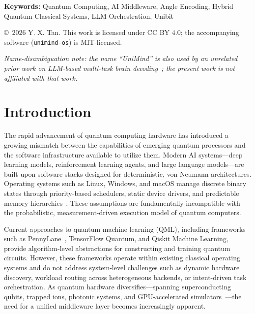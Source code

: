﻿\documentclass[12pt,a4paper]{article}
\begin{document}
\begin{titlepage}
\vspace{0.8cm}

\noindent\textbf{Keywords:} Quantum Computing, AI Middleware, Angle Encoding, Hybrid Quantum-Classical Systems, LLM Orchestration, Unibit

\vfill

{\small\copyright\ 2026 Y. X. Tan. This work is licensed under CC BY 4.0; the accompanying software (\texttt{unimind-os}) is MIT-licensed.}

\vspace{0.4cm}

{\small\itshape Name-disambiguation note: the name ``UniMind'' is also used by an unrelated prior work on LLM-based multi-task brain decoding~\cite{lu2025unimind}; the present work is not affiliated with that work.\par}

\end{titlepage}

\tableofcontents
\newpage

\section{Introduction}

The rapid advancement of quantum computing hardware has introduced a growing mismatch between the capabilities of emerging quantum processors and the software infrastructure available to utilize them. Modern AI systems---deep learning models, reinforcement learning agents, and large language models---are built upon software stacks designed for deterministic, von Neumann architectures. Operating systems such as Linux, Windows, and macOS manage discrete binary states through priority-based schedulers, static device drivers, and predictable memory hierarchies~\cite{tanenbaum2023}. These assumptions are fundamentally incompatible with the probabilistic, measurement-driven execution model of quantum computers.

Current approaches to quantum machine learning (QML), including frameworks such as PennyLane~\cite{bergholm2018}, TensorFlow Quantum, and Qiskit Machine Learning, provide algorithm-level abstractions for constructing and training quantum circuits. However, these frameworks operate within existing classical operating systems and do not address system-level challenges such as dynamic hardware discovery, workload routing across heterogeneous backends, or intent-driven task orchestration. As quantum hardware diversifies---spanning superconducting qubits, trapped ions, photonic systems, and GPU-accelerated simulators~\cite{microsoft2024,aws2024}---the need for a unified middleware layer becomes increasingly apparent.
\end{document}
